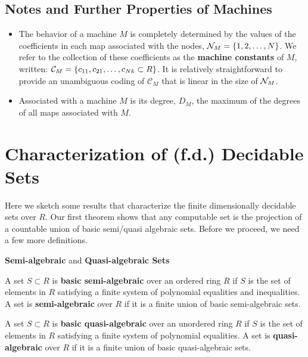 \subsection{Notes and Further Properties of Machines}

\begin{itemize}

\item The behavior of a machine $M$ is completely determined by the
  values of the coefficients in each map associated with the nodes,
  $\mathcal{N}_M = \{1, 2, \ldots, N\}$.  We refer to the collection of
  these coefficients as the \textbf{machine constants} of $M$,
  written: $\mathcal{C}_M = \{c_{11}, c_{21}, \ldots, c_{Nk}
    \subset R\}$.  It is relatively straightforward to provide an
  unambiguous coding of $\mathcal{C}_M$ that is linear in the size of
  $\mathcal{N}_M$.

\item Associated with a machine $M$ is its degree, $D_M$, the maximum
  of the degrees of all maps associated with $M$.
\end{itemize}

\section{Characterization of (f.d.) Decidable Sets}

Here we sketch some results that characterize the finite dimensionally
decidable sets over $R$.  Our first theorem shows that any computable
set is the projection of a countable union of basic semi/quasi
algebraic sets.  Before we proceed, we need a few more definitions.

  \begin{definition}{\textbf{Semi-algebraic} and \textbf{Quasi-algebraic Sets}}
    
    A set $S \subset R$ is \textbf{basic semi-algebraic} over an
    ordered ring $R$ if $S$ is the set of elements in $R$ satisfying
    a finite system of polynomial equalities and inequalities. A set
    is \textbf{semi-algebraic} over $R$ if it is a finite union of basic
    semi-algebraic sets.

    A set $S \subset R$ is \textbf{basic quasi-algebraic} over an
    unordered ring $R$ if $S$ is the set of elements in $R$ satisfying
    a finite system of polynomial equalities. A set is
    \textbf{quasi-algebraic} over $R$ if it is a finite union of basic
    quasi-algebraic sets.
    
  \end{definition}

